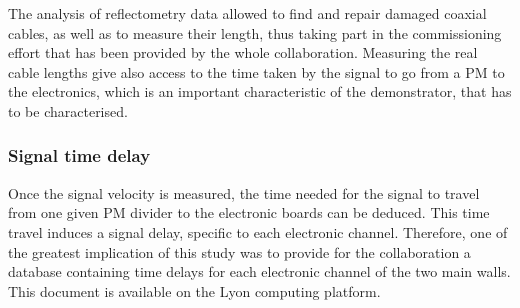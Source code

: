 The analysis of reflectometry data allowed to find and repair damaged coaxial cables, as well as to measure their length, thus taking part in the commissioning effort that has been provided by the whole collaboration.
Measuring the real cable lengths give also access to the time taken by the signal to go from a PM to the electronics, which is an important characteristic of the demonstrator, that has to be characterised.

\subsubsection*{Signal time delay}

Once the signal velocity is measured, the time needed for the signal to travel from one given PM divider to the electronic boards can be deduced.
This time travel induces a signal delay, specific to each electronic channel.
Therefore, one of the greatest implication of this study was to provide for the collaboration a database containing time delays for each electronic channel of the two main walls.
This document is available on the Lyon computing platform.


